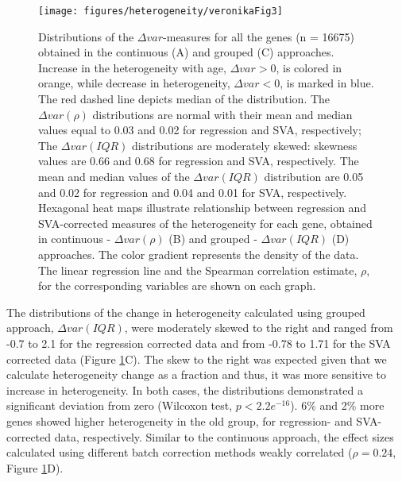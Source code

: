 \documentclass[12pt,twoside]{unicam}
\begin{document}
\begin{figure}

{\centering \texttt{[image: figures/heterogeneity/veronikaFig3]} 

}

\caption[Transcriptome-wide change in gene expression heterogeneity in ageing, using SVA and linear regression combined with continuous and grouped approaches.]{Distributions of the $\Delta var$-measures for all the genes (n = 16675) obtained in the continuous (A) and grouped (C) approaches. Increase in the heterogeneity with age, $\Delta var > 0$, is colored in orange, while decrease in heterogeneity, $\Delta var < 0$, is marked in blue. The red dashed  line depicts median of the distribution. The $\Delta var(\rho)$ distributions are normal with their mean and median values equal to  0.03  and  0.02  for  regression  and  SVA,  respectively;  The  $\Delta var(IQR)$    distributions  are  moderately  skewed:  skewness  values  are  0.66  and  0.68  for  regression  and  SVA,  respectively.  The  mean  and  median  values  of  the  $\Delta var(IQR)$  distribution  are  0.05  and  0.02  for  regression and 0.04 and 0.01 for SVA, respectively. Hexagonal heat maps illustrate relationship between regression and SVA-corrected measures  of  the  heterogeneity  for  each  gene,  obtained  in  continuous  - $\Delta var(\rho)$  (B)  and  grouped  - $\Delta var(IQR)$  (D)  approaches.  The  color  gradient represents the density of the data. The linear regression line and the Spearman correlation estimate, $\rho$, for the corresponding variables are shown on each graph.}\label{fig:veronikaFig3}
\end{figure}

The distributions of the change in heterogeneity calculated using grouped approach, \(\Delta var(IQR)\), were moderately skewed to the right and ranged from -0.7 to 2.1 for the regression corrected data and from -0.78 to 1.71 for the SVA corrected data (Figure \ref{fig:veronikaFig3}C). The skew to the right was expected given that we calculate heterogeneity change as a fraction and thus, it was more sensitive to increase in heterogeneity. In both cases, the distributions demonstrated a significant deviation from zero (Wilcoxon test, \(p<2.2e^{-16}\)). 6\% and 2\% more genes showed higher heterogeneity in the old group, for regression- and SVA-corrected data, respectively. Similar to the continuous approach, the effect sizes calculated using different batch correction methods weakly correlated (\(\rho = 0.24\), Figure \ref{fig:veronikaFig3}D).
\end{document}
